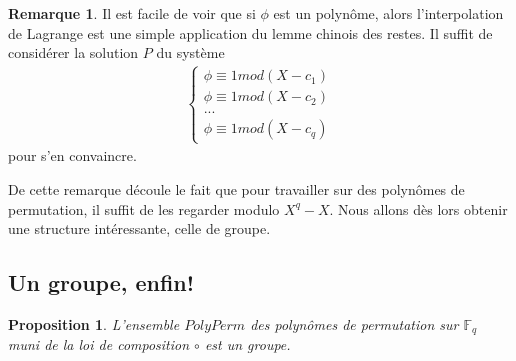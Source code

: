 \documentclass[12pt]{article}
\newcommand{\Fq}{\mathds{F}_q}
\newtheorem{prop}{Proposition}
\theoremstyle{definition}
\newtheorem{rem}{Remarque}
\begin{document}
\begin{rem}
Il est facile de voir que si $\phi $ est un polynôme, alors l'interpolation de Lagrange est une simple application du lemme chinois des restes. \newline
Il suffit de considérer la solution $P$ du système
	\begin{align}
		\begin{cases}
			\phi \equiv 1 mod (X - c_1) \\
			\phi \equiv 1 mod (X- c_2) \\
			... \\
			\phi \equiv 1 mod (X - c_q)
  		\end{cases}
	\end{align}
pour s'en convaincre.
\end{rem}

De cette remarque découle le fait que pour travailler sur des polynômes de permutation, il suffit de les regarder modulo $X^q - X$. Nous allons dès lors obtenir une structure intéressante, celle de groupe.

\subsection{Un groupe, enfin!} 

\begin{prop}
L'ensemble $PolyPerm$ des polynômes de permutation sur $\Fq$ muni de la loi de composition $\circ$ est un groupe.
\end{prop}
\end{document}
